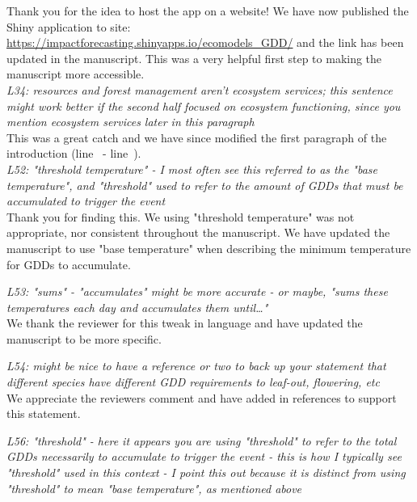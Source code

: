 \documentclass[11pt,a4paper]{article}\usepackage[]{graphicx}\usepackage[]{color}
\newcommand{\lr}[1]{line~\lineref{#1}}
\begin{document}
Thank you for the idea to host the app on a website! We have now published the Shiny application to site: \url{https://impactforecasting.shinyapps.io/ecomodels_GDD/} and the link has been updated in the manuscript. This was a very helpful first step to making the manuscript more accessible. \\ 

\textit{L34: resources and forest management aren't ecosystem services; this sentence might work better if the second half focused on ecosystem functioning, since you mention ecosystem services later in this paragraph} \\

This was a great catch and we have since modified the first paragraph of the introduction (\lr{Z1ecosys} - \lr{Z1ecosysend}). \\

\textit{L52: "threshold temperature" - I most often see this referred to as the "base temperature", and "threshold" used to refer to the amount of GDDs that must be accumulated to trigger the event} \\

Thank you for finding this. We using "threshold temperature" was not appropriate, nor consistent throughout the manuscript. We have updated the manuscript to use "base temperature" when describing the minimum temperature for GDDs to accumulate. 

\textit{L53: "sums" - "accumulates" might be more accurate - or maybe, "sums these temperatures each day and accumulates them until…"} \\

We thank the reviewer for this tweak in language and have updated the manuscript to be more specific.

\textit{L54: might be nice to have a reference or two to back up your statement that different species have different GDD requirements to leaf-out, flowering, etc} \\

We appreciate the reviewers comment and have added in references to support this statement. 

\textit{L56: "threshold" - here it appears you are using "threshold" to refer to the total GDDs necessarily to accumulate to trigger the event - this is how I typically see "threshold" used in this context - I point this out because it is distinct from using "threshold" to mean "base temperature", as mentioned above} \\
\end{document}
